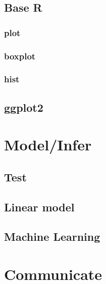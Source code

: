 \documentclass[
  12pt,
]{book}
\begin{document}
\hypertarget{base-r}{%
\chapter{Base R}\label{base-r}}

\hypertarget{plot}{%
\section{plot}\label{plot}}

\hypertarget{boxplot}{%
\section{boxplot}\label{boxplot}}

\hypertarget{hist}{%
\section{hist}\label{hist}}

\hypertarget{ggplot2}{%
\chapter{ggplot2}\label{ggplot2}}

\hypertarget{part-modelinfer}{%
\part{Model/Infer}\label{part-modelinfer}}

\hypertarget{test}{%
\chapter{Test}\label{test}}

\hypertarget{linear-model}{%
\chapter{Linear model}\label{linear-model}}

\hypertarget{machine-learning}{%
\chapter{Machine Learning}\label{machine-learning}}

\hypertarget{part-communicate}{%
\part{Communicate}\label{part-communicate}}
\end{document}
